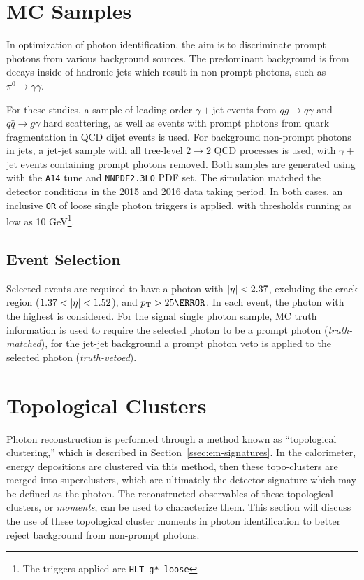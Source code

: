 \section{MC Samples}\label{sec:photon-id-samples}

In optimization of photon identification, the aim is to discriminate prompt photons from various background sources. The predominant background is from decays inside of hadronic jets which result in non-prompt photons, such as $\pi^{0}\rightarrow \gamma \gamma$.

For these studies, a sample of leading-order $\gamma+$jet events from $qg \rightarrow q \gamma$ and $q\bar{q} \rightarrow g \gamma$ hard scattering, as well as events with prompt photons from quark fragmentation in \gls{QCD} dijet events is used. For background non-prompt photons in jets, a jet-jet sample with all tree-level $2\rightarrow2$ QCD processes is used, with $\gamma+$jet events containing prompt photons removed. Both samples are generated using \peight with the \texttt{A14} tune and \texttt{NNPDF2.3LO} PDF set. The simulation matched the detector conditions in the 2015 and 2016 data taking period. In both cases, an inclusive \texttt{OR} of loose single photon triggers is applied, with thresholds running as low as 10 GeV\footnote{The triggers applied are \texttt{HLT\_g*\_loose}}.

\subsection{Event Selection}

Selected events are required to have a photon with $|\eta| < 2.37$, excluding the crack region ($1.37<\abseta<1.52$), and $\pt > \unit{25}{\GeV}$. In each event, the photon with the highest \pt is considered. For the signal single photon sample, \gls{MC} truth information is used to require the selected photon to be a prompt photon (\textit{truth-matched}), for the jet-jet background a prompt photon veto is applied to the selected photon (\textit{truth-vetoed}). 


\section{Topological Clusters}\label{sec:topo-clusters-yid}

Photon reconstruction is performed through a method known as ``topological clustering,'' which is described in Section~\ref{ssec:em-signatures}. In the calorimeter, energy depositions are clustered via this method, then these topo-clusters are merged into superclusters, which are ultimately the detector signature which may be defined as the photon. The reconstructed observables of these topological clusters, or \textit{moments}, can be used to characterize them. This section will discuss the use of these topological cluster moments in photon identification to better reject background from non-prompt photons.

